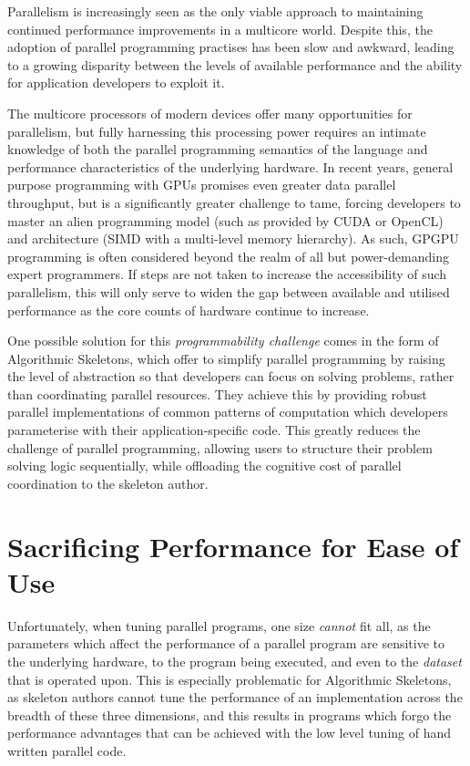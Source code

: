 Parallelism is increasingly seen as the only viable approach to
maintaining continued performance improvements in a multicore world.
Despite this, the adoption of parallel programming practises has been
slow and awkward, leading to a growing disparity between the levels of
available performance and the ability for application developers to
exploit it.

The multicore processors of modern devices offer many opportunities
for parallelism, but fully harnessing this processing power requires
an intimate knowledge of both the parallel programming semantics of
the language and performance characteristics of the underlying
hardware. In recent years, general purpose programming with GPUs
promises even greater data parallel throughput, but is a significantly
greater challenge to tame, forcing developers to master an alien
programming model (such as provided by CUDA or OpenCL) and
architecture (SIMD with a multi-level memory hierarchy). As such,
GPGPU programming is often considered beyond the realm of all but
power-demanding expert programmers. If steps are not taken to increase
the accessibility of such parallelism, this will only serve to widen
the gap between available and utilised performance as the core counts
of hardware continue to increase.

One possible solution for this \emph{programmability challenge} comes
in the form of Algorithmic Skeletons, which offer to simplify parallel
programming by raising the level of abstraction so that developers can
focus on solving problems, rather than coordinating parallel
resources. They achieve this by providing robust parallel
implementations of common patterns of computation which developers
parameterise with their application-specific code. This greatly
reduces the challenge of parallel programming, allowing users to
structure their problem solving logic sequentially, while offloading
the cognitive cost of parallel coordination to the skeleton author.


\section{Sacrificing Performance for Ease of Use}

Unfortunately, when tuning parallel programs, one size \emph{cannot}
fit all, as the parameters which affect the performance of a parallel
program are sensitive to the underlying hardware, to the program being
executed, and even to the \emph{dataset} that is operated upon. This
is especially problematic for Algorithmic Skeletons, as skeleton
authors cannot tune the performance of an implementation across the
breadth of these three dimensions, and this results in programs which
forgo the performance advantages that can be achieved with the low
level tuning of hand written parallel code.


